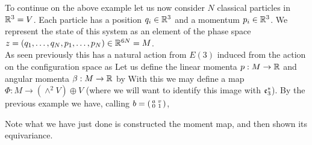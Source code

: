 \documentclass{article}
\begin{document}
\begin{example}
To continue on the above example let us now consider $N$ classical particles in $\mathbb{R}^3=V$. Each particle has a position $q_i\in \mathbb{R}^3$ and a momentum $p_i\in \mathbb{R}^3$. We represent the state of this system as an element of the phase space $z=(q_1, \dots, q_N,p_1, \dots, p_N) \in \mathbb{R}^{6N}=M$. \\
As seen previously this has a natural action from $E(3)$ induced from the action on the configuration space as 
Let us define the linear momenta $p: M \to \mathbb{R}$ and angular momenta $\beta: M \to \mathbb{R}$ by 
With this we may define a map $\Phi:M \to (\wedge^2 V) \oplus V$ (where we will want to identify this image with $\mathfrak{e}_3^\ast$).
By the previous example we have, calling $b=\begin{psmallmatrix} a & v \\ 0 & 1 \end{psmallmatrix}$,
\begin{remark}
Note what we have just done is constructed the moment map, and then shown its equivariance. 
\end{remark}


\end{example}
\end{document}
